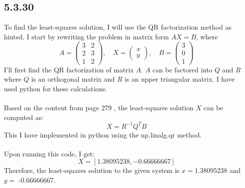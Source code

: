 \documentclass[manuscript,screen,review]{acmart}
\begin{document}
\subsection*{5.3.30}
To find the least-squares solution, I will use the QR factorization method as hinted.
I start by rewriting the problem in matrix form $A X=B$, where
$$
A=\left(\begin{array}{ll}
3 & 2 \\
2 & 3 \\
1 & 2
\end{array}\right), \quad X=\left(\begin{array}{l}
x \\
y
\end{array}\right), \quad B=\left(\begin{array}{l}
3 \\
0 \\
1
\end{array}\right)
$$
I'll first find the QR factorization of matrix $A$. $A$ can be factored into $Q$ and $R$ where $Q$ is an orthogonal matrix and $R$ is an upper triangular matrix. I have used python for these calculations. 
\\
\\
Based on the content from page 279 , the least-squares solution $X$ can be computed as:
$$
X=R^{-1} Q^T B
$$
This I have implemented in python using the np.linalg.qr method. 
\\
\\
Upon running this code, I get:
$$
X=[1.38095238,-0.66666667]
$$
Therefore, the least-squares solution to the given system is $x=1.38095238$ and $y=$ -0.66666667.
\end{document}
